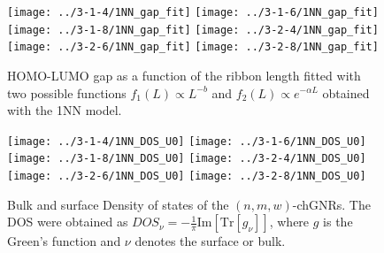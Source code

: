 \documentclass[amsmath,%
amssymb,prb,superscriptaddress]{revtex4}
\begin{document}
\begin{figure*}
	\texttt{[image: ../3-1-4/1NN\_gap\_fit]}
	\texttt{[image: ../3-1-6/1NN\_gap\_fit]}
	\texttt{[image: ../3-1-8/1NN\_gap\_fit]}
	\texttt{[image: ../3-2-4/1NN\_gap\_fit]}
	\texttt{[image: ../3-2-6/1NN\_gap\_fit]}
	\texttt{[image: ../3-2-8/1NN\_gap\_fit]}	
	\caption{HOMO-LUMO gap as a function of the ribbon length fitted with two possible functions $f_{1}(L) \propto L^{-b}$ and $f_{2}(L) \propto e^{-\alpha L}$ obtained with the 1NN model.}	
	\label{fig:gap-fit-length}		
\end{figure*}

\begin{figure*}
	\texttt{[image: ../3-1-4/1NN\_DOS\_U0]}
	\texttt{[image: ../3-1-6/1NN\_DOS\_U0]}
	\texttt{[image: ../3-1-8/1NN\_DOS\_U0]}
	\texttt{[image: ../3-2-4/1NN\_DOS\_U0]}
	\texttt{[image: ../3-2-6/1NN\_DOS\_U0]}
	\texttt{[image: ../3-2-8/1NN\_DOS\_U0]}
	\caption{Bulk and surface Density of states of the $(n,m,w)$-chGNRs. The DOS were obtained as $DOS_{\nu}=-\frac{1}{\pi}\mathrm{Im}\left[\mathrm{Tr}\left[ g_{\nu} \right]\right]$, where $g$ is the Green's function and $\nu$ denotes the surface or bulk.}		
\end{figure*}

% 
\end{document}
